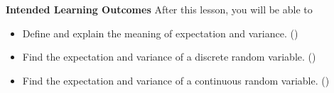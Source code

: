 \documentclass[10pt]{article}
\begin{document}
\thispagestyle{firstpage}
\pagestyle{otherpages}



\textbf{Intended Learning Outcomes}
After this lesson, you will be able to 

\begin{itemize}
    \item Define and explain the meaning of expectation and variance. ()
    \item Find the expectation and variance of a discrete random variable. ()
    \item Find the expectation and variance of a continuous random variable. ()
\end{itemize}

\vspace{-0.5cm}

\hrulefill
\end{document}
